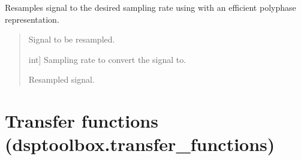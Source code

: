 \documentclass[letterpaper,10pt,english]{sphinxmanual}
\begin{document}
\begin{fulllineitems}
\label{\detokenize{modules/dsptoolbox.standard_functions:dsptoolbox.standard_functions.resample}}
\pysigstartsignatures
{}
\pysigstopsignatures
\sphinxAtStartPar
Resamples signal to the desired sampling rate using
 with an efficient polyphase representation.
\begin{quote}\begin{description}
\begin{description}
\sphinxlineitem{\sphinxstylestrong{sig}}{[}\sphinxtitleref{Signal}{]}
\sphinxAtStartPar
Signal to be resampled.

\sphinxlineitem{\sphinxstylestrong{desired\_sampling\_rate\_hz}}{[}int{]}
\sphinxAtStartPar
Sampling rate to convert the signal to.

\end{description}

\begin{description}
\sphinxlineitem{\sphinxstylestrong{new\_sig}}{[}\sphinxtitleref{Signal}{]}
\sphinxAtStartPar
Resampled signal.

\end{description}

\end{description}\end{quote}

\end{fulllineitems}


\sphinxstepscope


\section{Transfer functions (dsptoolbox.transfer\_functions)}
\label{\detokenize{modules/dsptoolbox.transfer_functions:module-dsptoolbox.transfer_functions}}\label{\detokenize{modules/dsptoolbox.transfer_functions:transfer-functions-dsptoolbox-transfer-functions}}\label{\detokenize{modules/dsptoolbox.transfer_functions::doc}}
\end{document}
